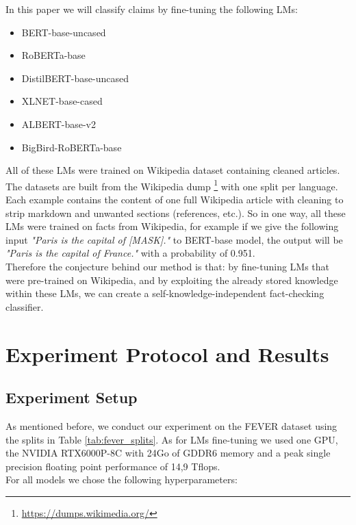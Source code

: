 \documentclass[10pt, english]{report}
\begin{document}
In this paper we will classify claims by fine-tuning the following LMs:

\begin{itemize}
\item BERT-base-uncased \cite{devlin2018bert}
\item RoBERTa-base \cite{liu2019roberta}
\item DistilBERT-base-uncased \cite{sanh2019distilbert}
\item XLNET-base-cased \cite{yang2019xlnet}
\item ALBERT-base-v2 \cite{lan2019albert}
\item BigBird-RoBERTa-base \cite{zaheer2020big}\\
\end{itemize}

All of these LMs were trained on Wikipedia dataset containing cleaned articles. The datasets are built from the Wikipedia dump \footnote{\url{https://dumps.wikimedia.org/}} with one split per language. Each example contains the content of one full Wikipedia article with cleaning to strip markdown and unwanted sections (references, etc.). So in one way, all these LMs were trained on facts from Wikipedia, for example if we give the following input \textit{"Paris is the capital of [MASK]."} to BERT-base model, the output will be \textit{"Paris is the capital of France."} with a probability of 0.951.\\
Therefore the conjecture behind our method is that: by fine-tuning LMs that were pre-trained on Wikipedia, and by exploiting the already stored knowledge within these LMs, we can create a self-knowledge-independent fact-checking classifier.

\section{Experiment Protocol and Results}
\subsection{Experiment Setup}
As mentioned before, we conduct our experiment on the FEVER dataset using the splits in Table \ref{tab:fever_splits}. As for LMs fine-tuning we used one GPU, the NVIDIA RTX6000P-8C with 24Go of GDDR6 memory and a peak single precision floating point performance of 14,9 Tflops.\\

For all models we chose the following hyperparameters:\\
\end{document}

